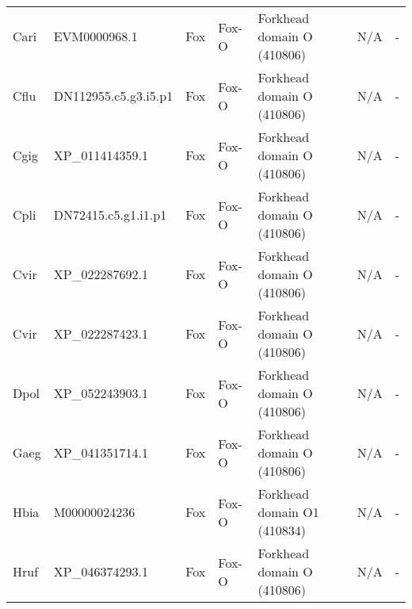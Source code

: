 \documentclass[../main.tex]{subfiles}
\begin{document}
\begin{landscape}
\begin{longtable}{lllllll}
		Cari           & EVM0000968.1          & Fox            & Fox-O               & Forkhead domain O (410806)                  & N/A                                                                    & -                    \\
		Cflu           & DN112955.c5.g3.i5.p1  & Fox            & Fox-O               & Forkhead domain O (410806)                  & N/A                                                                    & -                    \\
		Cgig           & XP\_011414359.1       & Fox            & Fox-O               & Forkhead domain O (410806)                  & N/A                                                                    & -                    \\
		Cpli           & DN72415.c5.g1.i1.p1   & Fox            & Fox-O               & Forkhead domain O (410806)                  & N/A                                                                    & -                    \\
		Cvir           & XP\_022287692.1       & Fox            & Fox-O               & Forkhead domain O (410806)                  & N/A                                                                    & -                    \\
		Cvir           & XP\_022287423.1       & Fox            & Fox-O               & Forkhead domain O (410806)                  & N/A                                                                    & -                    \\
		Dpol           & XP\_052243903.1       & Fox            & Fox-O               & Forkhead domain O (410806)                  & N/A                                                                    & -                    \\
		Gaeg           & XP\_041351714.1       & Fox            & Fox-O               & Forkhead domain O (410806)                  & N/A                                                                    & -                    \\
		Hbia           & M00000024236          & Fox            & Fox-O               & Forkhead domain O1 (410834)                 & N/A                                                                    & -                    \\
		Hruf           & XP\_046374293.1       & Fox            & Fox-O               & Forkhead domain O (410806)                  & N/A                                                                    & -                    \\

\end{longtable}
\end{landscape}
\end{document}
